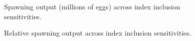 \documentclass[
]{scrartcl}
\begin{document}
\begin{figure}


\caption{\label{fig-sens_indices_spout}Spawning output (millions of
eggs) across index inclusion sensitivities.}

\end{figure}%

\begin{figure}


\caption{\label{fig-sens_indices_status}Relative spawning output across
index inclusion sensitivities.}

\end{figure}%
\end{document}
